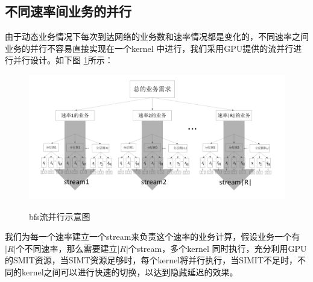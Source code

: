\subsection{不同速率间业务的并行}
由于动态业务情况下每次到达网络的业务数和速率情况都是变化的，不同速率之间业务的并行不容易直接实现在一个kernel 中进行，我们采用GPU提供的流并行进行并行设计。如下图 \ref{bfssteam}所示：
\begin{figure}
\setlength{\belowcaptionskip}{-0.5cm}
\begin{center}
{\includegraphics[width=1 \textwidth]{figures/hbfs.pdf}}
\end{center}
\caption{{\footnotesize{bfs流并行示意图}}}
\label{bfssteam}
\end{figure}
我们为每一个速率建立一个stream来负责这个速率的业务计算，假设业务一个有$|R|$个不同速率，那么需要建立$|R|$个stream，多个kernel 同时执行，充分利用GPU 的SMIT资源，当SIMT资源足够时，每个kernel将并行执行，当SIMIT不足时，不同的kernel之间可以进行快速的切换，以达到隐藏延迟的效果。

